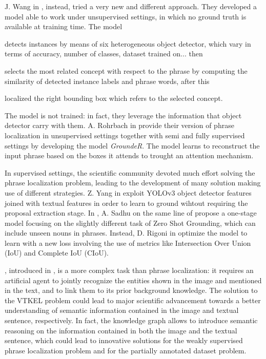 J. Wang in \etal{} , instead, tried a very new
and different approach. They developed a model able to work under
unsupervised settings, in which no ground truth is available at
training time. The model 
\begin{enumerate*}[label=(\roman*)] 
    \item detects instances by means of six heterogeneous object
    detector, which vary in terms of accuracy, number of classes,
    dataset trained on... then
    \item selects the most related concept with respect to the phrase
    by computing the similarity of detected instance labels and phrase
    words, after this
    \item localized the right bounding box which refers to the
    selected concept.
\end{enumerate*}
The model is not trained: in fact, they leverage the information that
object detector carry with them. A. Rohrbach \etal{} in  provide their version of phrase localization in
unsupervised settings together with semi and fully supervised settings
by developing the model \textit{GroundeR}. The model learns to
reconstruct the input phrase based on the boxes it attends to trought
an attention mechanism. 

In supervised settings, the scientific community devoted much effort
solving the phrase localization problem, leading to the development of
many solution making use of different strategies. 
Z. Yang \etal{} in  exploit YOLOv3 object detector features joined with textual
features in order to learn to ground wihtout requiring the proposal
extraction stage. In , A. Sadhu \etal{}
on the same line of  propose
a one-stage model focusing on the slightly different task of Zero Shot
Grounding, which can include unseen nouns in phrases. Instead, D.
Rigoni \etal{} in  optimize the model to
learn with a new loss involving the use of metrics like Intersection
Over Union (IoU) and Complete IoU (CIoU).

, introduced in
, is a more complex task than phrase
localization: it requires an artificial agent to jointly recognize the
entities shown in the image and mentioned in the text, and to link
them to its prior background knowledge. The solution to the VTKEL
problem could lead to major scientific advancement towards a better
understanding of semantic information contained in the image and
textual sentence, respectively. In fact, the knowledge graph allows to
introduce semantic reasoning on the information contained in both the
image and the textual sentence, which could lead to innovative
solutions for the weakly supervised phrase localization problem and
for the partially annotated dataset problem.


